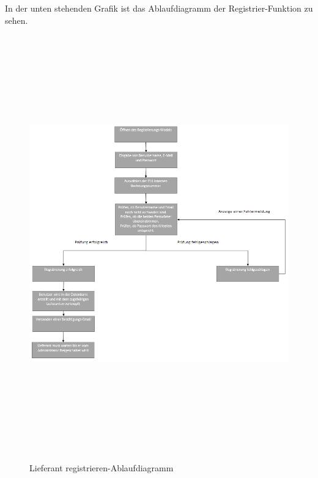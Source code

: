 \newpage
In der unten stehenden Grafik ist das Ablaufdiagramm der Registrier-Funktion zu sehen.
\begin{figure}[!h]
    \centering
    \includegraphics[width=17cm, height=18cm]{figures/register.png}
    \label{fig:register}
    \caption{Lieferant registrieren-Ablaufdiagramm}
\end{figure}
\newpage

